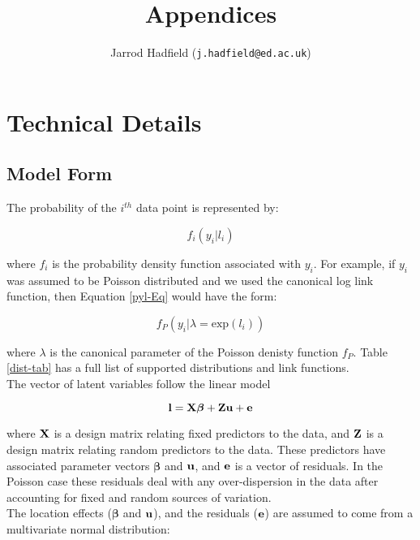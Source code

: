 \documentclass{article}
\title{Appendices}
\author{Jarrod Hadfield (\texttt{j.hadfield@ed.ac.uk})}
\begin{document}
\maketitle
\else
\chapter{Technical Details}
\label{chap7}
\fi




\section{Model Form}
The probability of the $i^{th}$ data point is represented by:

\begin{equation}
f_{i}(y_{i} | l_{i})
\label{pyl-Eq}
\end{equation}

where $f_{i}$ is the probability density function associated with $y_{i}$. For example, if $y_{i}$ was assumed to be Poisson distributed and we used the canonical log link function, then Equation \ref{pyl-Eq} would have the form:

\begin{equation}
f_{P}\left(y_{i} | \lambda = \textrm{exp}(l_{i})\right)
\label{pyl2-Eq}
\end{equation}

where $\lambda$ is the canonical parameter of the Poisson denisty function $f_{P}$. Table \ref{dist-tab} has a full list of supported distributions and link functions.\\

The vector of latent variables follow the linear model

\begin{equation}
{\bf l}  = {\bf X}{\bm \beta}+{\bf Z}{\bf u}+{\bf e}
\label{l-Eq}
\end{equation}
 
where ${\bf X}$ is a design matrix relating fixed predictors to the data, and ${\bf Z}$ is a design matrix relating random predictors to the data.  These predictors have associated parameter vectors ${\bm \beta}$ and ${\bf u}$, and ${\bf e}$ is a vector of residuals.  In the Poisson case these residuals deal with any over-dispersion in the data after accounting for fixed and random sources of variation.\\

The location effects (${\bm \beta}$ and ${\bf u}$), and the residuals (${\bf e}$) are assumed to come from a multivariate normal distribution:
\end{document}
